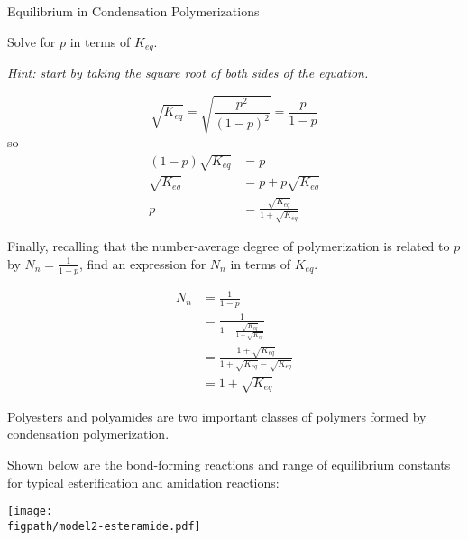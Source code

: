 \begin{activity}{Equilibrium in Condensation Polymerizations}
\begin{ctqs}
	\question Solve for $p$ in terms of $K_{eq}$.
	\label{\labelbase:ctq:Keqp}
		
		\emph{Hint: start by taking the square root of both sides of the equation.}
	
		\begin{solution}[3.25in]
			\begin{equation*}
				\sqrt{K_{eq}} = \sqrt{\frac{p^2}{(1-p)^2}} = \frac{p}{1-p}
			\end{equation*}
			so
			\begin{align*}
				(1-p)\sqrt{K_{eq}} &= p\\
				\sqrt{K_{eq}} &= p + p\sqrt{K_{eq}}  \\
				p &= \frac{\sqrt{K_{eq}}}{1+\sqrt{K_{eq}}}
			\end{align*}
		\end{solution}
	
	
	\question Finally, recalling that the number-average degree of polymerization is related to $p$ by $N_n = \frac{1}{1-p}$, find an expression for $N_n$ in terms of $K_{eq}$.
		
		\begin{solution}[4.5in]
			\begin{align*}
				N_n &= \frac{1}{1-p} \\
				&= \frac{1}{1-\frac{\sqrt{K_{eq}}}{1+\sqrt{K_{eq}}}}\\
				&= \frac{1+\sqrt{K_{eq}}}{1+\sqrt{K_{eq}} - \sqrt{K_{eq}}}\\
				&= 1+ \sqrt{K_{eq}}
			\end{align*}
		\end{solution}
		
\end{ctqs}
	
\clearpage %
\begin{model}
\label{\labelbase:mdl:K}

Polyesters and polyamides are two important classes of polymers formed by condensation polymerization.

Shown below are the bond-forming reactions and range of equilibrium constants for typical esterification and amidation reactions:
	
		\vspace{0.1in}
		\centerline{\texttt{[image: \\figpath/model2-esteramide.pdf]}}

\end{model}


\end{activity}
